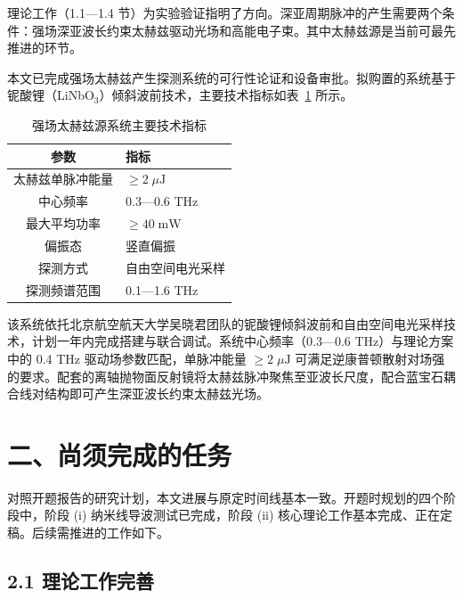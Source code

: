 \documentclass[a4paper,12pt]{ctexart}
\begin{document}
理论工作（1.1—1.4 节）为实验验证指明了方向。深亚周期脉冲的产生需要两个条件：强场深亚波长约束太赫兹驱动光场和高能电子束。其中太赫兹源是当前可最先推进的环节。

本文已完成强场太赫兹产生探测系统的可行性论证和设备审批。拟购置的系统基于铌酸锂（LiNbO$_3$）倾斜波前技术，主要技术指标如表~\ref{tab:thz-spec} 所示。

\begin{table}[H]
    \caption{\label{tab:thz-spec}强场太赫兹源系统主要技术指标}
    \begin{tabularx}{\linewidth}{c|X}
        \hline
        \textbf{参数} & \textbf{指标} \\
        \hline
        太赫兹单脉冲能量 & $\geq 2\;\mu\text{J}$ \\
        \hline
        中心频率 & 0.3—0.6 THz \\
        \hline
        最大平均功率 & $\geq 40\;\text{mW}$ \\
        \hline
        偏振态 & 竖直偏振 \\
        \hline
        探测方式 & 自由空间电光采样 \\
        \hline
        探测频谱范围 & 0.1—1.6 THz \\
        \hline
    \end{tabularx}
\end{table}

该系统依托北京航空航天大学吴晓君团队的铌酸锂倾斜波前和自由空间电光采样技术，计划一年内完成搭建与联合调试。系统中心频率（0.3—0.6 THz）与理论方案中的 0.4 THz 驱动场参数匹配，单脉冲能量 $\geq 2\;\mu\text{J}$ 可满足逆康普顿散射对场强的要求。配套的离轴抛物面反射镜将太赫兹脉冲聚焦至亚波长尺度，配合蓝宝石耦合线对结构即可产生深亚波长约束太赫兹光场。

\section{二、尚须完成的任务}

对照开题报告的研究计划，本文进展与原定时间线基本一致。开题时规划的四个阶段中，阶段 (i) 纳米线导波测试已完成，阶段 (ii) 核心理论工作基本完成、正在定稿。后续需推进的工作如下。

\subsection{2.1 理论工作完善}
\end{document}
